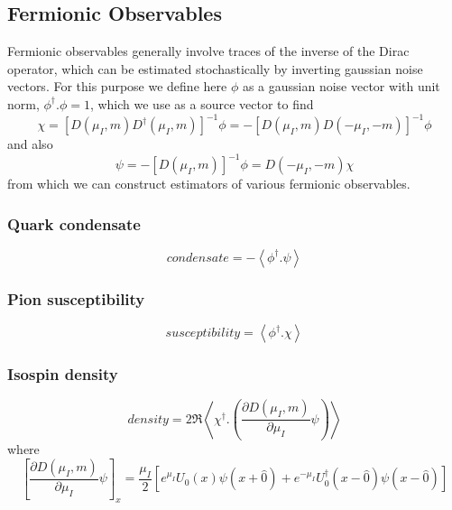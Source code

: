 \documentclass[a4paper,12pt]{article}
\begin{document}
\subsection{Fermionic Observables}
Fermionic observables generally involve traces of the inverse of the Dirac operator, which can be estimated stochastically by 
inverting gaussian noise vectors. For this purpose we define here $\phi$ as a gaussian noise vector with unit norm, $\phi^{\dagger}.\phi=1$,
which we use as a source vector to find
\begin{equation}
 \chi = \left[D(\mu_I,m) D^{\dagger}(\mu_I,m)\right]^{-1} \phi = -\left[D(\mu_I,m) D(-\mu_I,-m)\right]^{-1} \phi
\end{equation}
and also
\begin{equation}
 \psi = -\left[D(\mu_I,m)\right]^{-1} \phi = D(-\mu_I,-m) \chi
\end{equation}
from which we can construct estimators of various fermionic observables.

\subsubsection{Quark condensate}
\begin{equation}
 condensate = -\left\langle \phi^{\dagger}.\psi \right\rangle
\end{equation}

\subsubsection{Pion susceptibility}
\begin{equation}
 susceptibility = \left\langle \phi^{\dagger}.\chi \right\rangle
\end{equation}

\subsubsection{Isospin density}
\begin{equation}
 density = 2 \Re \left\langle \chi^{\dagger}.\left(\frac{\partial D(\mu_I,m)}{\partial\mu_I}\psi\right) \right\rangle
\end{equation}
where
\begin{equation}
 \left[\frac{\partial D(\mu_I,m)}{\partial\mu_I}\psi\right]_x =\frac{\mu_I}{2}\left[ e^{\mu_I} U_0(x) \psi(x+\hat0) + e^{-\mu_I} U^{\dagger}_0(x-\hat0) \psi(x-\hat0)\right]
\end{equation}
\end{document}
